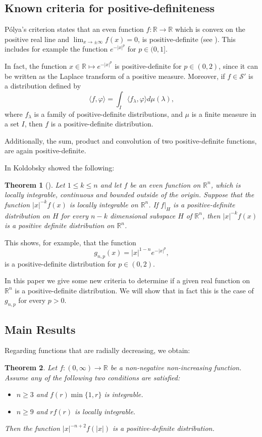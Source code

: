 \documentclass{amsart}
\newtheorem{theorem}{Theorem}
\def \R {\mathbb R}
\def \S {\mathcal S}
\begin{document}
\subsection{Known criteria for positive-definiteness}
P\'olya's criterion states that an even function $f:\R \to \R$ which is convex on the positive real line and $\lim_{x \to \pm \infty} f(x) = 0$, is positive-definite (see \cite{polya1949remarks}).
This includes for example the function $e^{-|x|^p}$ for $p \in (0,1]$.

In fact, the function $x\in\R \mapsto e^{-|x|^p}$ is positive-definite for $p \in (0,2)$, since it can be written as the Laplace transform of a positive measure.
Moreover, if $f \in \S'$ is a distribution defined by
\[\langle f, \varphi \rangle = \int_I \langle f_\lambda, \varphi \rangle d\mu(\lambda),\]
where $f_\lambda$ is a family of positive-definite distributions, and $\mu$ is a finite measure in a set $I$, then $f$ is a positive-definite distribution.

Additionally, the sum, product and convolution of two positive-definite functions, are again positive-definite.

In \cite{koldobsky2002derivatives} Koldobsky showed the following:
\begin{theorem}[{\cite[Theorem 3]{koldobsky2002derivatives}}]
	\label{thm_subspace}
	Let $1 \leq k \leq n$ and let $f$ be an even function on $\R^n$, which is locally integrable, continuous and bounded outside of the origin. Suppose that the function $|x|^{-k} f(x)$ is locally integrable on $\R^n$. If $f|_H$ is a positive-definite distribution on $H$ for every $n-k$ dimensional subspace $H$ of $\R^n$, then $|x|^{-k} f(x)$ is a positive definite distribution on $\R^n$.
\end{theorem}
This shows, for example, that the function
\begin{equation}
	\label{eq_goodexample}
	g_{n,p}(x) = |x|^{1-n} e^{-|x|^p},
\end{equation}
is a positive-definite distribution for $p \in (0,2)$.

In this paper we give some new criteria to determine if a given real function on $\R^n$ is a positive-definite distribution.
We will show that in fact this is the case of $g_{n,p}$ for every $p>0$.

\subsection{Main Results}

Regarding functions that are radially decreasing, we obtain:
\begin{theorem}
	\label{thm_decreasing_dimn}
	Let $f:(0,\infty) \to \R$ be a non-negative non-increasing function.
	Assume any of the following two conditions are satisfied:
	\begin{itemize}
		\item $n \geq 3$ and $f(r) \min\{1, r\}$ is integrable.
		\item $n \geq 9$ and $r f(r)$ is locally integrable.
	\end{itemize}
	Then the function $|x|^{-n+2} f(|x|)$ is a positive-definite distribution.
\end{theorem}
\end{document}
